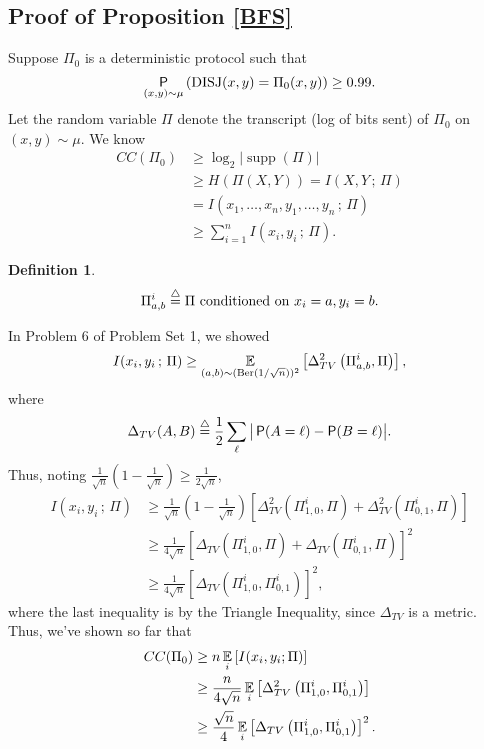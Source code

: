 \documentclass[twoside]{article}
\newcounter{tnum}
\newtheorem{definition}[tnum]{Definition}
\newcommand\pr{\operatornamewithlimits{\mathsf{P}}}
\newcommand\E{\operatornamewithlimits{\mathbb{E}}}
\newcommand\disj{\operatorname{DISJ}}
\newcommand\supp{\operatorname{supp}}
\begin{document}
\subsection{Proof of Proposition \ref{BFS}}
\vspace{-0.1in}
Suppose $\Pi_0$ is a deterministic protocol such that
\[\pr_{(x,y) \sim \mu}
    \left( \disj(x,y) = \Pi_0(x,y) \right)
    \geq 0.99.
\]
Let the random variable $\Pi$ denote the transcript (log of bits sent) of
$\Pi_0$ on $(x,y) \sim \mu$. We know
\begin{align*}
CC(\Pi_0)
 & \geq \log_2 \big| \supp (\Pi) \big|             \\
 & \geq H(\Pi(X,Y)) = I(X,Y \, ; \, \Pi)           \\
 & =    I(x_1,\dots,x_n,y_1,\dots,y_n \, ; \, \Pi) \\
 & \geq \sum_{i = 1}^n I(x_i,y_i \, ; \, \Pi).
\end{align*}
\begin{definition}
\normalfont
\[\Pi_{a,b}^i
    \buildrel\triangle\over = \Pi
        \mbox{ conditioned on } x_i = a, y_i = b.
\]
\end{definition}
In Problem 6 of Problem Set 1, we showed
\[I(x_i,y_i \, ; \, \Pi)
    \geq \E_{(a,b)\sim (\operatorname{Ber}(1/\sqrt n))^2}
    \left[ \Delta_{TV}^2 \left( \Pi_{a,b}^i, \Pi \right) \right],
\]
where
\[\Delta_{TV}(A,B)
    \buildrel\triangle\over = \frac12
        \sum_\ell \big| \pr(A = \ell) - \pr(B = \ell) \big|.
\]
Thus, noting
$\frac1{\sqrt n}\left( 1 - \frac1{\sqrt n} \right) \geq \frac{1}{2\sqrt n}$,
\begin{align*}
I(x_i,y_i \, ; \, \Pi)
 & \geq \frac1{\sqrt n}\left( 1 - \frac1{\sqrt n} \right)
    \left[ \Delta_{TV}^2 \left( \Pi^i_{1,0}, \Pi \right)
            + \Delta_{TV}^2 \left( \Pi^i_{0,1}, \Pi \right) \right] \\
 & \geq \frac1{4 \sqrt n}
    \left[ \Delta_{TV} \left( \Pi^i_{1,0}, \Pi \right)
            + \Delta_{TV} \left( \Pi^i_{0,1}, \Pi \right) \right]^2 \\
 & \geq \frac1{4 \sqrt n}
    \left[ \Delta_{TV} \left( \Pi^i_{1,0}, \Pi^i_{0,1} \right) \right]^2,
\end{align*}
where the last inequality is by the Triangle Inequality, since $\Delta_{TV}$ is
a metric. Thus, we've shown so far that
\begin{align*}
CC(\Pi_0)
 & \geq n\E_i \left[ I(x_i,y_i ; \Pi) \right]   \\
 & \geq \frac{n}{4\sqrt n} \E_i
        \left[ \Delta_{TV}^2 \left( \Pi_{1,0}^i, \Pi_{0,1}^i \right) \right] \\
 & \geq \frac{\sqrt n}{4} \E_i
        \left[ \Delta_{TV} \left( \Pi_{1,0}^i, \Pi_{0,1}^i \right) \right]^2.
\end{align*}
\end{document}
